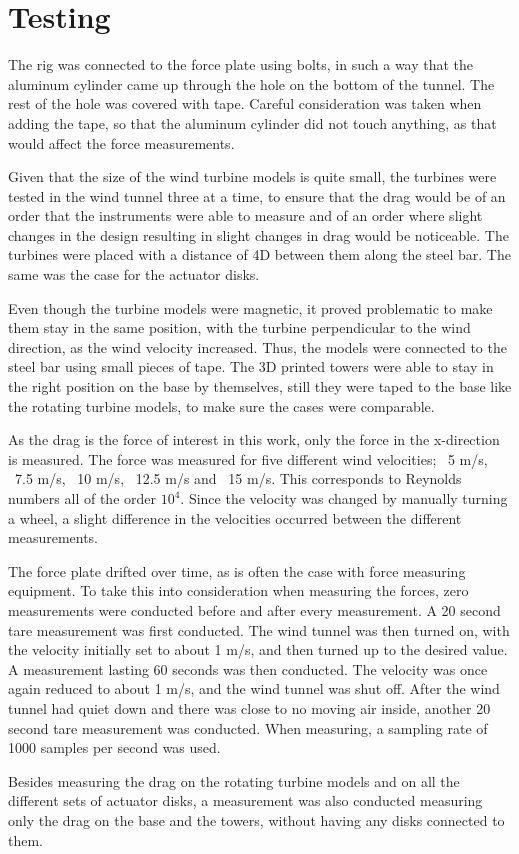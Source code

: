 \section{Testing}
The rig was connected to the force plate using bolts, in such a way that the aluminum cylinder came up through the hole on the bottom of the tunnel. The rest of the hole was covered with tape. Careful consideration was taken when adding the tape, so that the aluminum cylinder did not touch anything, as that would affect the force measurements. 

Given that the size of the wind turbine models is quite small, the turbines were tested in the wind tunnel three at a time, to ensure that the drag would be of an order that the instruments were able to measure and of an order where slight changes in the design resulting in slight changes in drag would be noticeable. The turbines were placed with a distance of 4D between them along the steel bar. The same was the case for the actuator disks. %

Even though the turbine models were magnetic, it proved problematic to make them stay in the same position, with the turbine perpendicular to the wind direction, as the wind velocity increased. Thus, the models were connected to the steel bar using small pieces of tape. The 3D printed towers were able to stay in the right position on the base by themselves, still they were taped to the base like the rotating turbine models, to make sure the cases were comparable. 

As the drag is the force of interest in this work, only the force in the x-direction is measured. The force was measured for five different wind velocities; ~5 m/s, ~7.5 m/s, ~10 m/s, ~12.5 m/s and ~15 m/s. This corresponds to Reynolds numbers all of the order $10^4$. Since the velocity was changed by manually turning a wheel, a slight difference in the velocities occurred between the different measurements. 

The force plate drifted over time, as is often the case with force measuring equipment. To take this into consideration when measuring the forces, zero measurements were conducted before and after every measurement. A 20 second tare measurement was first conducted. The wind tunnel was then turned on, with the velocity initially set to about 1 m/s, and then turned up to the desired value. A measurement lasting 60 seconds was then conducted. The velocity was once again reduced to about 1 m/s, and the wind tunnel was shut off. After the wind tunnel had quiet down and there was close to no moving air inside, another 20 second tare measurement was conducted. When measuring, a sampling rate of 1000 samples per second was used. %

Besides measuring the drag on the rotating turbine models and on all the different sets of actuator disks, a measurement was also conducted measuring only the drag on the base and the towers, without having any disks connected to them. 

